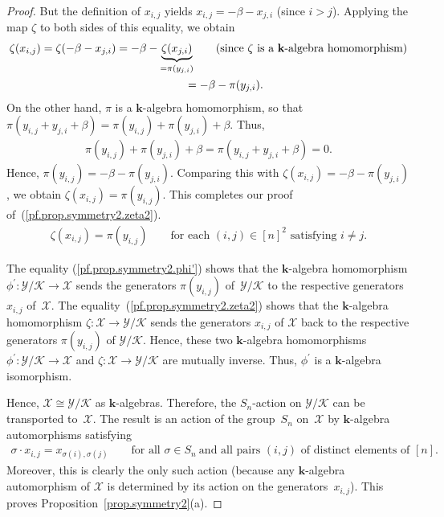 \documentclass[pdftex]{sigma}
\numberwithin{equation}{section}
\begin{document}
\begin{proof}
{But the definition of $x_{i,j}$ yields $x_{i,j}=-\beta-x_{j,i}$ (since $i>j$). Applying the map $\zeta$ to both sides of this equality, we obtain
\begin{gather*}
\zeta(x_{i,j}) =\zeta( -\beta-x_{j,i})=-\beta-\underbrace{\zeta(x_{j,i}) }_{=\pi( y_{j,i} ) }\qquad (\text{since }\zeta\text{ is a }\mathbf{k}\text{-algebra homomorphism}) \\
\hphantom{\zeta(x_{i,j})}{} =-\beta-\pi(y_{j,i}) .
\end{gather*}
On the other hand, $\pi$ is a $\mathbf{k}$-algebra homomorphism, so that $\pi( y_{i,j}+y_{j,i}+\beta) =\pi(y_{i,j}) +\pi(y_{j,i}) +\beta$. Thus,
\begin{gather*}
\pi(y_{i,j}) +\pi(y_{j,i}) +\beta=\pi ( y_{i,j}+y_{j,i}+\beta) =0.
\end{gather*}
Hence, $\pi(y_{i,j}) =-\beta-\pi(y_{j,i}) $. Comparing this with $\zeta(x_{i,j}) =-\beta-\pi ( y_{j,i}) $, we obtain $\zeta(x_{i,j}) =\pi(y_{i,j}) $. This completes our proof of~(\ref{pf.prop.symmetry2.zeta2}).}
\begin{gather}
\zeta(x_{i,j}) =\pi(y_{i,j}) \qquad \text{for each }(i,j) \in[n] ^{2}\text{ satisfying }i\neq j. \label{pf.prop.symmetry2.zeta2}
\end{gather}

The equality (\ref{pf.prop.symmetry2.phi'}) shows that the $\mathbf{k}$-algebra homomorphism $\phi^{\prime}\colon \mathcal{Y}/\mathcal{K}\rightarrow \mathcal{X}$ sends the generators $\pi(y_{i,j}) $ of~$\mathcal{Y}/\mathcal{K}$ to the respective generators $x_{i,j}$ of~$\mathcal{X}$. The equality~(\ref{pf.prop.symmetry2.zeta2}) shows that the $\mathbf{k}$-algebra homomorphism $\zeta\colon \mathcal{X}\rightarrow\mathcal{Y}/\mathcal{K}$ sends the generators $x_{i,j}$ of $\mathcal{X}$ back to the respective generators $\pi(y_{i,j}) $ of $\mathcal{Y}/\mathcal{K}$. Hence, these two $\mathbf{k}$-algebra homomorphisms $\phi^{\prime}\colon \mathcal{Y}/\mathcal{K}\rightarrow\mathcal{X}$ and $\zeta\colon \mathcal{X}\rightarrow\mathcal{Y}/\mathcal{K}$ are mutually inverse. Thus, $\phi^{\prime}$ is a $\mathbf{k}$-algebra isomorphism.

Hence, $\mathcal{X}\cong\mathcal{Y}/\mathcal{K}$ as $\mathbf{k} $-algebras. Therefore, the $S_{n}$-action on $\mathcal{Y}/\mathcal{K}$ can be transported to~$\mathcal{X}$. The result is an action of the group~$S_{n}$ on~$\mathcal{X}$ by $\mathbf{k}$-algebra automorphisms satisfying
\begin{gather*}
\sigma\cdot x_{i,j}=x_{\sigma(i) ,\sigma(j)}\qquad \text{for all }\sigma\in S_{n}\ \text{and all pairs }(i,j) \text{ of distinct elements of }[n].
\end{gather*}
Moreover, this is clearly the only such action (because any $\mathbf{k}$-algebra automorphism of $\mathcal{X}$ is determined by its action on the generators~$x_{i,j}$). This proves Proposition~\ref{prop.symmetry2}(a).


\end{proof}
\end{document}
